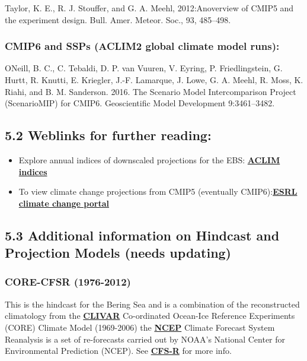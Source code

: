 \documentclass[
]{article}
\begin{document}
Taylor, K. E., R. J. Stouffer, and G. A. Meehl, 2012:Anoverview of CMIP5
and the experiment design. Bull. Amer. Meteor. Soc., 93, 485--498.

\hypertarget{cmip6-and-ssps-aclim2-global-climate-model-runs}{%
\subsubsection{CMIP6 and SSPs (ACLIM2 global climate model
runs):}\label{cmip6-and-ssps-aclim2-global-climate-model-runs}}

ONeill, B. C., C. Tebaldi, D. P. van Vuuren, V. Eyring, P.
Friedlingstein, G. Hurtt, R. Knutti, E. Kriegler, J.-F. Lamarque, J.
Lowe, G. A. Meehl, R. Moss, K. Riahi, and B. M. Sanderson. 2016. The
Scenario Model Intercomparison Project (ScenarioMIP) for CMIP6.
Geoscientific Model Development 9:3461--3482.

\hypertarget{weblinks-for-further-reading}{%
\subsection{5.2 Weblinks for further
reading:}\label{weblinks-for-further-reading}}

\begin{itemize}
\item
  Explore annual indices of downscaled projections for the EBS:
  \href{https://kholsman.shinyapps.io/aclim/}{\textbf{ACLIM indices}}
\item
  To view climate change projections from CMIP5 (eventually
  CMIP6):\href{https://www.esrl.noaa.gov/psd/ipcc/ocn/}{\textbf{ESRL
  climate change portal }}
\end{itemize}

\hypertarget{additional-information-on-hindcast-and-projection-models-needs-updating}{%
\subsection{5.3 Additional information on Hindcast and Projection Models
(needs
updating)}\label{additional-information-on-hindcast-and-projection-models-needs-updating}}

\hypertarget{core-cfsr-1976-2012}{%
\subsubsection{CORE-CFSR (1976-2012)}\label{core-cfsr-1976-2012}}

This is the hindcast for the Bering Sea and is a combination of the
reconstructed climatology from the
\href{http://portal.aoos.org/bering-sea.php\#module-metadata/5626a0b6-7d79-11e3-ac17-00219bfe5678/0756e6c2-a8e2-40af-aa3d-22051ed68067}{\textbf{CLIVAR}}
Co-ordinated Ocean-Ice Reference Experiments (CORE) Climate Model
(1969-2006) the
\href{http://portal.aoos.org/bering-sea.php\#module-metadata/f8cb79f6-7d59-11e3-a6ee-00219bfe5678/2deb2eca-f3f5-4eda-a132-112468711de7}{\textbf{NCEP}}
Climate Forecast System Reanalysis is a set of re-forecasts carried out
by NOAA's National Center for Environmental Prediction (NCEP). See
\href{http://cfs.ncep.noaa.gov/cfsr/}{\textbf{CFS-R}} for more info.
\end{document}
